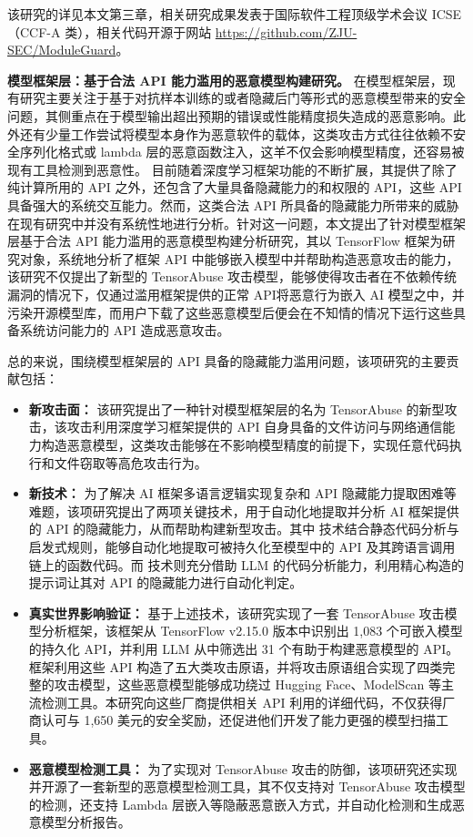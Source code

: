 该研究的详见本文第三章，相关研究成果发表于国际软件工程顶级学术会议 ICSE （CCF-A 类），相关代码开源于网站 \url{https://github.com/ZJU-SEC/ModuleGuard}。

\textbf{模型框架层：基于合法 API 能力滥用的恶意模型构建研究。}
在模型框架层，现有研究主要关注于基于对抗样本训练的或者隐藏后门等形式的恶意模型带来的安全问题，其侧重点在于模型输出超出预期的错误或性能精度损失造成的恶意影响。此外还有少量工作尝试将模型本身作为恶意软件的载体，这类攻击方式往往依赖不安全序列化格式或 lambda 层的恶意函数注入，这羊不仅会影响模型精度，还容易被现有工具检测到恶意性。
目前随着深度学习框架功能的不断扩展，其提供了除了纯计算所用的 API 之外，还包含了大量具备隐藏能力的和权限的 API，这些 API 具备强大的系统交互能力。然而，这类合法 API 所具备的隐藏能力所带来的威胁在现有研究中并没有系统性地进行分析。针对这一问题，本文提出了针对模型框架层基于合法 API 能力滥用的恶意模型构建分析研究，其以 TensorFlow 框架为研究对象，系统地分析了框架 API 中能够嵌入模型中并帮助构造恶意攻击的能力，该研究不仅提出了新型的 TensorAbuse 攻击模型，能够使得攻击者在不依赖传统漏洞的情况下，仅通过滥用框架提供的正常 API将恶意行为嵌入 AI 模型之中，并污染开源模型库，而用户下载了这些恶意模型后便会在不知情的情况下运行这些具备系统访问能力的 API 造成恶意攻击。

总的来说，围绕模型框架层的 API 具备的隐藏能力滥用问题，该项研究的主要贡献包括：
\begin{itemize}
\item \textbf{新攻击面：} 该研究提出了一种针对模型框架层的名为 TensorAbuse 的新型攻击，该攻击利用深度学习框架提供的 API 自身具备的文件访问与网络通信能力构造恶意模型，这类攻击能够在不影响模型精度的前提下，实现任意代码执行和文件窃取等高危攻击行为。
\item \textbf{新技术：} 为了解决 AI 框架多语言逻辑实现复杂和 API 隐藏能力提取困难等难题，该项研究提出了两项关键技术，用于自动化地提取并分析 AI 框架提供的 API 的隐藏能力，从而帮助构建新型攻击。其中  技术结合静态代码分析与启发式规则，能够自动化地提取可被持久化至模型中的 API 及其跨语言调用链上的函数代码。而  技术则充分借助 LLM 的代码分析能力，利用精心构造的提示词让其对 API 的隐藏能力进行自动化判定。
\item \textbf{真实世界影响验证：} 基于上述技术，该研究实现了一套 TensorAbuse 攻击模型分析框架，该框架从 TensorFlow v2.15.0 版本中识别出 1,083 个可嵌入模型的持久化 API，并利用 LLM 从中筛选出 31 个有助于构建恶意模型的 API。框架利用这些 API 构造了五大类攻击原语，并将攻击原语组合实现了四类完整的攻击模型，这些恶意模型能够成功绕过 Hugging Face、ModelScan 等主流检测工具。本研究向这些厂商提供相关 API 利用的详细代码，不仅获得厂商认可与 1,650 美元的安全奖励，还促进他们开发了能力更强的模型扫描工具。
\item \textbf{恶意模型检测工具：} 为了实现对 TensorAbuse 攻击的防御，该项研究还实现并开源了一套新型的恶意模型检测工具，其不仅支持对 TensorAbuse 攻击模型的检测，还支持 Lambda 层嵌入等隐蔽恶意嵌入方式，并自动化检测和生成恶意模型分析报告。
\end{itemize}


